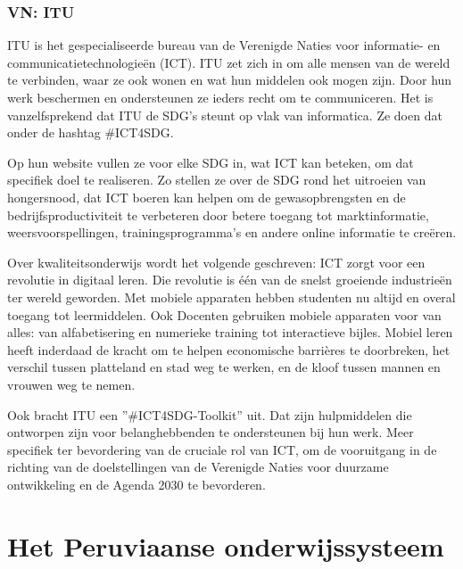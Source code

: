 \subsubsection{VN: ITU}
ITU is het gespecialiseerde bureau van de  Verenigde Naties voor informatie- en communicatietechnologieën (ICT). ITU zet zich in om alle mensen van de wereld te verbinden, waar ze ook wonen en wat hun middelen ook mogen zijn. Door hun werk beschermen en ondersteunen ze ieders recht om te communiceren.
Het is vanzelfsprekend dat ITU de SDG's steunt op vlak van informatica. Ze doen dat onder de hashtag \#ICT4SDG. \autocite{ITU2015}

Op hun website vullen ze voor elke SDG in, wat ICT kan beteken, om dat specifiek doel te realiseren. Zo stellen ze over de SDG rond het uitroeien van hongersnood, dat ICT boeren kan helpen om de gewasopbrengsten en de bedrijfsproductiviteit te verbeteren door betere toegang tot marktinformatie, weersvoorspellingen, trainingsprogramma's en andere online informatie te creëren. \autocite{ITU2015}

Over kwaliteitsonderwijs wordt het volgende geschreven: ICT zorgt voor een revolutie in digitaal leren. Die revolutie is één van de snelst groeiende industrieën ter wereld geworden. Met mobiele apparaten hebben studenten nu altijd en overal toegang tot leermiddelen. Ook Docenten gebruiken mobiele apparaten voor van alles: van alfabetisering en numerieke training tot interactieve bijles. Mobiel leren heeft inderdaad de kracht om te helpen economische barrières te doorbreken, het verschil tussen platteland en stad weg te werken, en de kloof tussen mannen en vrouwen weg te nemen. \autocite{ITU2015}

Ook bracht ITU een ''\#ICT4SDG-Toolkit'' uit. Dat zijn hulpmiddelen die ontworpen zijn voor belanghebbenden te ondersteunen bij hun werk. Meer specifiek ter bevordering van de cruciale rol van ICT, om de vooruitgang in de richting van de doelstellingen van de Verenigde Naties voor duurzame ontwikkeling en de Agenda 2030 te bevorderen. \autocite{ITU2015}
 
\section{Het Peruviaanse onderwijssysteem}
